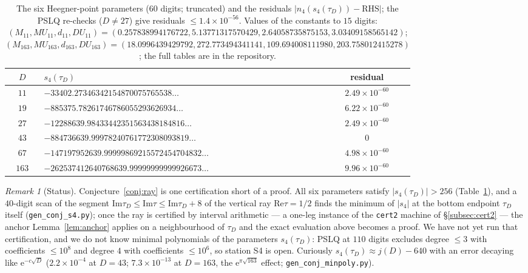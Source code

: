 \documentclass[11pt]{article}
\newcommand{\e}{\mathrm{e}}
\newcommand{\ReT}{\mathrm{Re}}
\newcommand{\ImT}{\mathrm{Im}}
\theoremstyle{definition}
\theoremstyle{remark}
\newtheorem{remark}[theorem]{Remark}
\begin{document}
\begin{table}[ht]
\centering\footnotesize
\begin{tabular}{@{}clc@{}}
\toprule
$D$ & $s_4(\tau_D)$ & residual\\
\midrule
$11$ & $-33402.27346342154870075765538\ldots$ & $2.49\times10^{-60}$\\
$19$ & $-885375.78261746786055293626934\ldots$ & $6.22\times10^{-60}$\\
$27$ & $-12288639.98433442351563438184816\ldots$ & $2.49\times10^{-60}$\\
$43$ & $-884736639.99978240761772308093819\ldots$ & $0$\\
$67$ & $-147197952639.99999869215572454704832\ldots$ & $4.98\times10^{-60}$\\
$163$ & $-262537412640768639.99999999999926673\ldots$ & $9.96\times10^{-60}$\\
\bottomrule
\end{tabular}
\caption{The six Heegner-point parameters ($60$ digits; truncated)
and the residuals $|n_4(s_4(\tau_D))-\mathrm{RHS}|$; the PSLQ
re-checks ($D\neq27$) give residuals $\le1.4\times10^{-56}$. Values of the
constants to $15$ digits:
$(M_{11},MU_{11},d_{11},DU_{11})
=(0.257838994176722,\allowbreak5.13771317570429,\allowbreak
2.64058735875153,\allowbreak3.03409158565142)$;
$(M_{163},MU_{163},d_{163},DU_{163})
=(18.0996439429792,\allowbreak272.773494341141,\allowbreak
109.694008111980,\allowbreak203.758012415278)$; the full tables are
in the repository.}
\label{tab:ray}
\end{table}

\begin{remark}[Status]\label{rem:raystatus}
Conjecture~\ref{conj:ray} is one certification short of a proof.
All six parameters satisfy $|s_4(\tau_D)|>256$
(Table~\ref{tab:ray}), and a $40$-digit scan of the segment
$\ImT\tau_D\le\ImT\tau\le\ImT\tau_D+8$ of the vertical ray
$\ReT\tau=1/2$ finds the minimum of
$|s_4|$ at the bottom endpoint $\tau_D$ itself
(\texttt{gen\_conj\_s4.py}); once the ray is certified by interval
arithmetic --- a one-leg instance of the \texttt{cert2} machine of
\S\ref{subsec:cert2} --- the anchor Lemma~\ref{lem:anchor} applies
on a neighbourhood of $\tau_D$ and the exact evaluation above
becomes a proof. We have not yet run that certification, and we do
not know minimal polynomials of the parameters $s_4(\tau_D)$: PSLQ
at $110$ digits excludes degree $\le3$ with coefficients
$\le10^8$ and degree $4$ with coefficients $\le10^6$, so station
S4 is open. Curiously
$s_4(\tau_D)\approx j(D)-640$ with an error decaying like
$\e^{-c\sqrt D}$ ($2.2\times10^{-4}$ at $D=43$;
$7.3\times10^{-13}$ at $D=163$, the $\e^{\pi\sqrt{163}}$ effect;
\texttt{gen\_conj\_minpoly.py}).
\end{remark}
\end{document}
